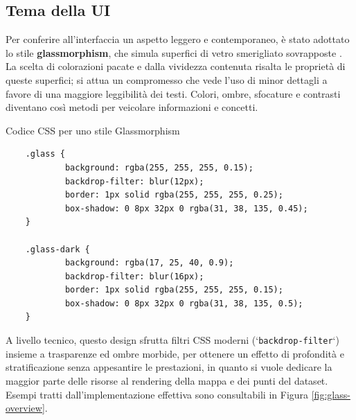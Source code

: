 \subsection{Tema della UI}

Per conferire all'interfaccia un aspetto leggero e contemporaneo, è stato adottato lo stile \textbf{glassmorphism}, che simula superfici di vetro smerigliato sovrapposte \cite{glassmorphism-css}. La scelta di colorazioni pacate e dalla vividezza contenuta risalta le proprietà di queste superfici; si attua un compromesso che vede l'uso di minor dettagli a favore di una maggiore leggibilità dei testi. Colori, ombre, sfocature e contrasti diventano così metodi per veicolare informazioni e concetti. 

\begin{listing}[H]
\caption{Codice CSS per uno stile Glassmorphism}
\label{lst:css_glassmorphism} %
\begin{verbatim}
    .glass {
            background: rgba(255, 255, 255, 0.15);
            backdrop-filter: blur(12px);
            border: 1px solid rgba(255, 255, 255, 0.25);
            box-shadow: 0 8px 32px 0 rgba(31, 38, 135, 0.45);
    }
    
    .glass-dark {
            background: rgba(17, 25, 40, 0.9);
            backdrop-filter: blur(16px);
            border: 1px solid rgba(255, 255, 255, 0.15);
            box-shadow: 0 8px 32px 0 rgba(31, 38, 135, 0.5);
    }
\end{verbatim}
\end{listing}

A livello tecnico, questo design sfrutta filtri CSS moderni (`\texttt{backdrop-filter}`) insieme a trasparenze ed ombre morbide, per ottenere un effetto di profondità e stratificazione senza appesantire le prestazioni, in quanto si vuole dedicare la maggior parte delle risorse al rendering della mappa e dei punti del dataset.
Esempi tratti dall'implementazione effettiva sono consultabili in Figura \ref{fig:glass-overview}.

